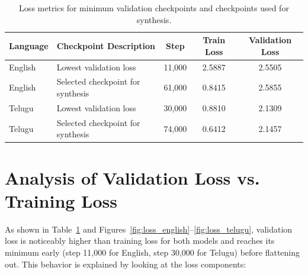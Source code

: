 \documentclass[11pt,a4paper]{report}
\begin{document}
\begin{table}[!htbp]
\centering
\caption{Loss metrics for minimum validation checkpoints and checkpoints used for synthesis.}
\label{tab:ckpt}
\small
\begin{tabular}{llccc}
\toprule
\textbf{Language} & \textbf{Checkpoint Description} & \textbf{Step} & \textbf{Train Loss} & \textbf{Validation Loss} \\
\midrule
English & Lowest validation loss & 11{,}000 & 2.5887 & 2.5505 \\
English & Selected checkpoint for synthesis & 61{,}000 & 0.8415 & 2.5855 \\
Telugu & Lowest validation loss & 30{,}000 & 0.8810 & 2.1309 \\
Telugu & Selected checkpoint for synthesis & 74{,}000 & 0.6412 & 2.1457 \\
\bottomrule
\end{tabular}
\end{table}

\section{Analysis of Validation Loss vs. Training Loss}
As shown in Table~\ref{tab:ckpt} and Figures~\ref{fig:loss_english}--\ref{fig:loss_telugu}, validation loss is noticeably higher than training loss for both models and reaches its minimum early (step 11{,}000 for English, step 30{,}000 for Telugu) before flattening out. This behavior is explained by looking at the loss components:
\end{document}
